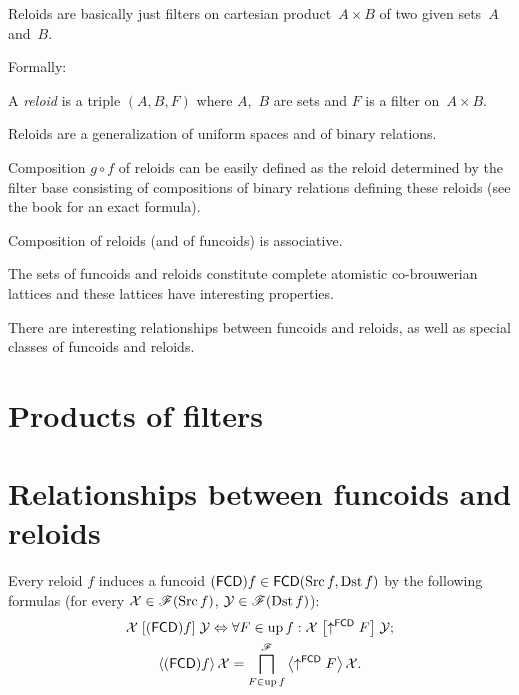 \documentclass{amsart}
\begin{document}
Reloids are basically just filters on cartesian product~$A\times B$ of two given sets~$A$ and~$B$.

Formally:

\begin{defn}
A \emph{reloid} is a triple $(A,B,F)$ where $A$,~$B$ are sets and $F$ is a filter on~$A\times B$.
\end{defn}

Reloids are a generalization of uniform spaces and of binary relations.

\begin{defn}
Composition $g\circ f$ of reloids can be easily defined as the reloid determined by the filter base
consisting of compositions of binary relations defining these reloids (see the book for an exact formula).
\end{defn}

\begin{prop}
Composition of reloids (and of funcoids) is associative.
\end{prop}

The sets of funcoids and reloids constitute complete atomistic co-brouwerian lattices and these lattices have interesting
properties.

There are interesting relationships between funcoids and reloids, as well as special classes of funcoids and reloids.

\section{Products of filters}

\section{Relationships between funcoids and reloids}


Every reloid $f$ induces a funcoid
$(\mathsf{FCD}) f\in\mathsf{FCD}(\operatorname{Src} f,\operatorname{Dst} f)$ by the following formulas
(for every $\mathcal{X}\in\mathscr{F}(\operatorname{Src} f)$, $\mathcal{Y}\in\mathscr{F}(\operatorname{Dst} f)$):
\begin{gather*}
\mathcal{X}\mathrel{\left[(\mathsf{FCD}) f\right]}\mathcal{Y}\Leftrightarrow\forall F\in\operatorname{up} f:\mathcal{X}\mathrel{\left[\uparrow^{\mathsf{FCD}}F\right]}\mathcal{Y};\\
\left\langle (\mathsf{FCD}) f\right\rangle\mathcal{X}=\bigsqcap_{F\in\operatorname{up} f}^{\mathscr{F}}\left\langle \uparrow^{\mathsf{FCD}}F\right\rangle\mathcal{X}.
\end{gather*}
\end{document}
